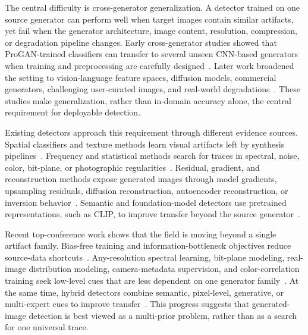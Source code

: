 \documentclass[lettersize,journal]{IEEEtran}
\begin{document}
The central difficulty is cross-generator generalization. A detector trained on one source generator can perform well when target images contain similar artifacts, yet fail when the generator architecture, image content, resolution, compression, or degradation pipeline changes. Early cross-generator studies showed that ProGAN-trained classifiers can transfer to several unseen CNN-based generators when training and preprocessing are carefully designed~\cite{wang2020cnnspot}. Later work broadened the setting to vision-language feature spaces, diffusion models, commercial generators, challenging user-curated images, and real-world degradations~\cite{ojha2023univfd,zhu2023genimage,yan2025aide,li2025rrdataset}. These studies make generalization, rather than in-domain accuracy alone, the central requirement for deployable detection.

Existing detectors approach this requirement through different evidence sources. Spatial classifiers and texture methods learn visual artifacts left by synthesis pipelines~\cite{wang2020cnnspot,liu2020gramnet,zhong2023patchcraft}. Frequency and statistical methods search for traces in spectral, noise, color, bit-plane, or photographic regularities~\cite{frank2020frequency,liu2022realimages,karageorgiou2025spai,zhong2025beyond,wang2025lota}. Residual, gradient, and reconstruction methods expose generated images through model gradients, upsampling residuals, diffusion reconstruction, autoencoder reconstruction, or inversion behavior~\cite{tan2023lgrad,tan2024npr,wang2023dire,ricker2024aeroblade,luo2024lare2,cazenavette2024fakeinversion}. Semantic and foundation-model detectors use pretrained representations, such as CLIP, to improve transfer beyond the source generator~\cite{radford2021clip,ojha2023univfd,cozzolino2024clip}.

Recent top-conference work shows that the field is moving beyond a single artifact family. Bias-free training and information-bottleneck objectives reduce source-data shortcuts~\cite{guillaro2025biasfree,zhang2025vibnet}. Any-resolution spectral learning, bit-plane modeling, real-image distribution modeling, camera-metadata supervision, and color-correlation training seek low-level cues that are less dependent on one generator family~\cite{karageorgiou2025spai,wang2025lota,liu2022realimages,zhong2025beyond,zhong2026metadata,zhong2026color}. At the same time, hybrid detectors combine semantic, pixel-level, generative, or multi-expert cues to improve transfer~\cite{yan2025aide,cheng2025cospy,tan2026mcan,li2026synerdetect}. This progress suggests that generated-image detection is best viewed as a multi-prior problem, rather than as a search for one universal trace.
\end{document}
